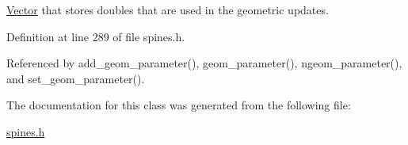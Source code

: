 \hyperlink{classoomph_1_1Vector}{Vector} that stores doubles that are used in the geometric updates. 



Definition at line 289 of file spines.\+h.



Referenced by add\+\_\+geom\+\_\+parameter(), geom\+\_\+parameter(), ngeom\+\_\+parameter(), and set\+\_\+geom\+\_\+parameter().



The documentation for this class was generated from the following file\+:\begin{DoxyCompactItemize}
\item 
\hyperlink{spines_8h}{spines.\+h}\end{DoxyCompactItemize}
